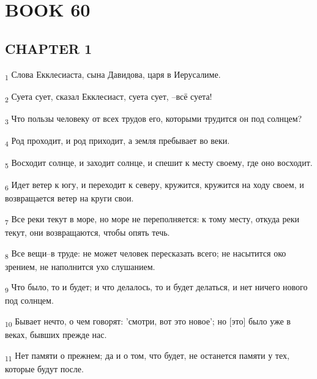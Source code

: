 \section{BOOK 60}
\subsection{CHAPTER 1}
\begin{tcolorbox}
\textsubscript{1} Слова Екклесиаста, сына Давидова, царя в Иерусалиме.
\end{tcolorbox}
\begin{tcolorbox}
\textsubscript{2} Суета сует, сказал Екклесиаст, суета сует, --всё суета!
\end{tcolorbox}
\begin{tcolorbox}
\textsubscript{3} Что пользы человеку от всех трудов его, которыми трудится он под солнцем?
\end{tcolorbox}
\begin{tcolorbox}
\textsubscript{4} Род проходит, и род приходит, а земля пребывает во веки.
\end{tcolorbox}
\begin{tcolorbox}
\textsubscript{5} Восходит солнце, и заходит солнце, и спешит к месту своему, где оно восходит.
\end{tcolorbox}
\begin{tcolorbox}
\textsubscript{6} Идет ветер к югу, и переходит к северу, кружится, кружится на ходу своем, и возвращается ветер на круги свои.
\end{tcolorbox}
\begin{tcolorbox}
\textsubscript{7} Все реки текут в море, но море не переполняется: к тому месту, откуда реки текут, они возвращаются, чтобы опять течь.
\end{tcolorbox}
\begin{tcolorbox}
\textsubscript{8} Все вещи--в труде: не может человек пересказать всего; не насытится око зрением, не наполнится ухо слушанием.
\end{tcolorbox}
\begin{tcolorbox}
\textsubscript{9} Что было, то и будет; и что делалось, то и будет делаться, и нет ничего нового под солнцем.
\end{tcolorbox}
\begin{tcolorbox}
\textsubscript{10} Бывает нечто, о чем говорят: 'смотри, вот это новое'; но [это] было уже в веках, бывших прежде нас.
\end{tcolorbox}
\begin{tcolorbox}
\textsubscript{11} Нет памяти о прежнем; да и о том, что будет, не останется памяти у тех, которые будут после.
\end{tcolorbox}
